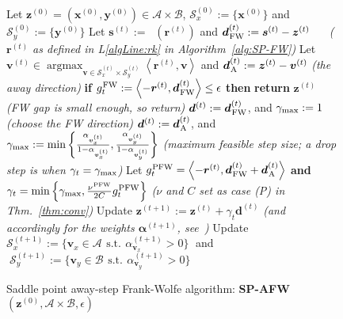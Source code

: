 \documentclass[twoside]{article}
\newcommand{\x}{\bm{x}}
\newcommand{\y}{\bm{y}}
\newcommand{\z}{\bm{z}}
\newcommand{\st}{\bm{s}^{(t)}}
\newcommand{\vt}{\bm{v}^{(t)}}
\newcommand{\dt}{\bm{d}^{(t)}}
\newcommand{\rt}{\r^{(t)}}
\newcommand{\gap}{g_{t}}
\newcommand{\CondNumb}{\nu}
\DeclareMathOperator*{\argmax}{\arg\max}
\newcommand{\stepsize}{\gamma}
\newcommand{\stepmax}{\stepsize_{\textnormal{\scriptsize max}}} %
\newcommand{\FW}{{\hspace{0.05em}\textnormal{FW}}}
\newcommand{\PW}{{\hspace{0.05em}\textnormal{PFW}}}
\newcommand{\away}{{\hspace{0.05em}\textnormal{A}}}
\newcommand{\vv}{\bm{v}} %
\DeclareMathOperator*{\lmo}{LMO_{\!\Vertices}}
\newcommand{\A}{\mathcal{A}}
\newcommand{\B}{\mathcal{B}}
\newcommand{\Vertices}{\mathcal{A}\times \mathcal{B}} %
\newcommand{\Coreset}{\mathcal{S}}
\renewcommand{\aa}{\bm{\alpha}}
\renewcommand{\r}{\bm{r}}
\newcommand{\innerProd}[2]{\left\langle #1 , #2 \right\rangle}
\newcommand{\0}{\mathbf{0}} %
\begin{document}
\begin{figure*}[ttt]
\begin{minipage}[t]{\textwidth}
\begin{algorithm}[H]
    \caption{Saddle point away-step Frank-Wolfe algorithm: \textbf{SP-AFW}$(\z^{(0)}, \Vertices, \epsilon)$}\label{alg:AFW}
  \begin{algorithmic}[1]
%
  \STATE Let $\z^{(0)}=(\x^{(0)},\y^{(0)}) \in \Vertices$, $\Coreset_x^{(0)} := \{\x^{(0)}\}$ and $\Coreset_y^{(0)} := \{\y^{(0)}\}$
    \STATE Let $\st := \lmo \!\left(\rt\right)$ %
       and $\dt_\FW := \st - \z^{(t)}$ \hspace{27mm}~~ \emph{\small($\rt$ as defined in L\ref{algLine:rk} in Algorithm~\ref{alg:SP-FW})}
    \STATE Let $\vt \in \displaystyle\argmax_{\vv \in \Coreset_x^{(t)} \times \Coreset_y^{(t)} } \textstyle\left\langle \rt, \vv \right\rangle$ and $\dt_\away := \z^{(t)} - \vt$ \hspace{51mm} \emph{\small(the away direction)}  \label{algLine:awayCorner}
    \STATE \textbf{if} $g_t^\FW  := \left\langle -\rt, \dt_\FW\right\rangle  \leq \epsilon$ \textbf{then} \textbf{return} $\z^{(t)}$ \hspace{38mm}\emph{\small(FW gap is small enough, so return)} \label{algLine:gapFW}
      \IF{$\left\langle -\rt, \dt_\FW\right\rangle  \geq \left\langle -\rt, \dt_\away\right\rangle$ } \label{algLine:begAFW}
      \STATE $\dt :=  \dt_\FW$, and $\stepmax := 1$  
           \hspace{77mm}\emph{\small(choose the FW direction)}
      \ELSE
      \STATE $\dt :=  \dt_\away$, and $\stepmax := \min\left\{\tfrac{\alpha_{\vv_x^{(t)}}}{1- \alpha_{\vv_x^{(t)}}},\tfrac{\alpha_{\vv_y^{(t)}}}{1- \alpha_{\vv_y^{(t)}}}\right\}$
        \emph{\small(maximum feasible step size; a \emph{drop step} is when $\stepsize_t = \stepmax$)} \label{algLine:drop_step}
       \vspace{-2mm}	
      \ENDIF \label{algLine:endAFW}
      \STATE Let $\gap^{\PW} = \innerProd{-\rt}{\dt_{\FW} + \dt_{\away}}$ \textbf{and} $\gamma_t = \min \left\{\gamma_{\max} , \frac{\CondNumb^{\PW}}{2 C}\gap^{\PW} \right\}$ \hfill \emph{\small($\CondNumb$ and $C$ set as case (P) in Thm.~\ref{thm:conv})} \label{algLine:gapPFW}
      \STATE Update $\z^{(t+1)} := \z^{(t)} + \stepsize_t \dt$  
        \hspace{4mm}\emph{\small(and accordingly for the weights $\aa^{(t+1)}$, see~\citet{lacoste2015global})} 
      \STATE Update $\Coreset_x^{(t+1)} := \{\vv_x \in \A \,\: \mathrm{ s.t. } \,\: \alpha^{(t+1)}_{\vv_x} > 0\}\;$ and $\;\Coreset_y^{(t+1)}:=\{\vv_y \in \B \,\: \mathrm{ s.t. } \,\: \alpha^{(t+1)}_{\vv_y} >0\}$ \label{algLine:activeSet}

\end{algorithmic}
\end{algorithm}
\end{minipage}
\end{figure*}
\end{document}
